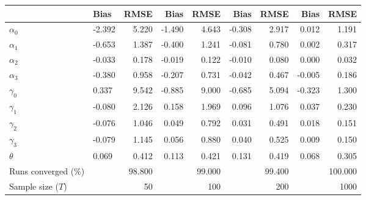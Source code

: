 
\begin{tabular}[t]{llrrrrrrr}
\toprule
  & Bias & RMSE & Bias & RMSE & Bias & RMSE & Bias & RMSE\\
\midrule
$\alpha_{0}$ & -2.392 & 5.220 & -1.490 & 4.643 & -0.308 & 2.917 & 0.012 & 1.191\\
$\alpha_{1}$ & -0.653 & 1.387 & -0.400 & 1.241 & -0.081 & 0.780 & 0.002 & 0.317\\
$\alpha_{2}$ & -0.033 & 0.178 & -0.019 & 0.122 & -0.010 & 0.080 & 0.000 & 0.032\\
$\alpha_{3}$ & -0.380 & 0.958 & -0.207 & 0.731 & -0.042 & 0.467 & -0.005 & 0.186\\
$\gamma_{0}$ & 0.337 & 9.542 & -0.885 & 9.000 & -0.685 & 5.094 & -0.323 & 1.300\\
$\gamma_{1}$ & -0.080 & 2.126 & 0.158 & 1.969 & 0.096 & 1.076 & 0.037 & 0.230\\
$\gamma_{2}$ & -0.076 & 1.046 & 0.049 & 0.792 & 0.031 & 0.491 & 0.018 & 0.151\\
$\gamma_{3}$ & -0.079 & 1.145 & 0.056 & 0.880 & 0.040 & 0.525 & 0.009 & 0.150\\
$\theta$ & 0.069 & 0.412 & 0.113 & 0.421 & 0.131 & 0.419 & 0.068 & 0.305\\
Runs converged (\%) &  & 98.800 &  & 99.000 &  & 99.400 &  & 100.000\\
Sample size ($T$) &  & 50 &  & 100 &  & 200 &  & 1000\\
\bottomrule
\end{tabular}
